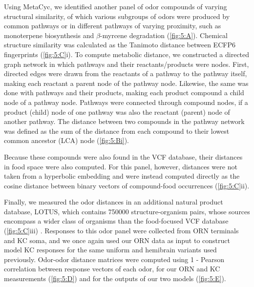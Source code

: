 \documentclass[12pt]{caltech_thesis}
\renewcommand{\cite}{{ }\autocite}
\begin{document}
\begin{refsection}
Using MetaCyc, we identified another panel of odor compounds of varying structural similarity, of which various subgroups of odors were produced by common pathways or in different pathways of varying proximity, such as monoterpene biosynthesis and $\beta$-myrcene degradation (\cref{fig:5:A}).
Chemical structure similarity was calculated as the Tanimoto distance between ECFP6 fingerprints (\cref{fig:5:C}i).
To compute metabolic distance, we constructed a directed graph network in which pathways and their reactants/products were nodes.
First, directed edges were drawn from the reactants of a pathway to the pathway itself, making each reactant a parent node of the pathway node.
Likewise, the same was done with pathways and their products, making each product compound a child node of a pathway node.
Pathways were connected through compound nodes, if a product (child) node of one pathway was also the reactant (parent) node of another pathway.
The distance between two compounds in the pathway network was defined as the sum of the distance from each compound to their lowest common ancestor (LCA) node (\cref{fig:5:Bi}). 

Because these compounds were also found in the VCF database, their distances in food space were also computed.
For this panel, however, distances were not taken from a hyperbolic embedding and were instead computed directly as the cosine distance between binary vectors of compound-food occurrences (\cref{fig:5:C}ii).

Finally, we measured the odor distances in an additional natural product database, LOTUS, which contains \num{750000} structure-organism pairs, whose sources encompass a wider class of organisms than the food-focused VCF database (\cref{fig:5:C}iii)\cite{LOTUS}.
Responses to this odor panel were collected from ORN terminals and KC soma, and we once again used our ORN data as input to construct model KC responses for the same uniform and hemibrain variants used previously.
Odor-odor distance matrices were computed using 1 - Pearson correlation between response vectors of each odor, for our ORN and KC measurements (\cref{fig:5:D}) and for the outputs of our two models (\cref{fig:5:E}).


\end{refsection}
\end{document}
